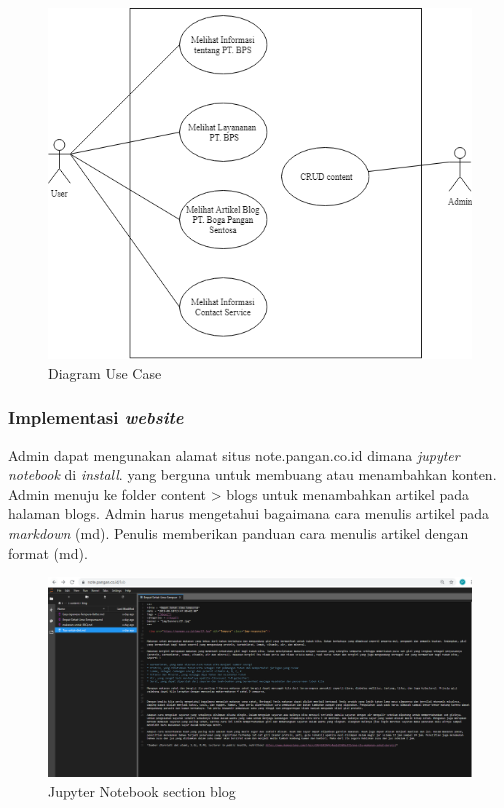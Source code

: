 \begin{figure}[htbp]
    \begin{center}
    \includegraphics[width=12cm]{img/diag-usecase.png}
    \caption{Diagram Use Case}
    \label{gambar:diag-usecase}
    \end{center}
\end{figure}

\subsubsection{Implementasi \emph{website}}
Admin dapat mengunakan alamat situs note.pangan.co.id 
dimana \emph{jupyter notebook} di \emph{install}. yang berguna 
untuk membuang atau menambahkan konten.  
Admin menuju ke folder content > blogs untuk menambahkan artikel pada halaman blogs. 
Admin harus mengetahui bagaimana cara menulis artikel pada \emph{markdown} (md). 
Penulis memberikan panduan cara menulis artikel dengan format (md). 

\begin{figure}[htbp]
    \begin{center}
    \includegraphics[width=12cm]{img/scr-adm-1.png}
    \caption{Jupyter Notebook section blog}
    \label{gambar:scr-adm-1}
    \end{center}
\end{figure}


